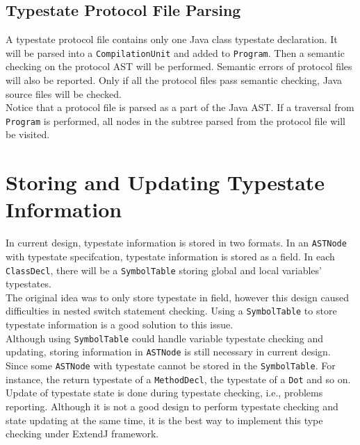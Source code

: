 \documentclass[]{article}
\begin{document}
\subsection{Typestate Protocol File Parsing}
A typestate protocol file contains only one Java class typestate declaration. It will be parsed into a \texttt{CompilationUnit} and added to \texttt{Program}. Then a semantic checking on the protocol AST will be performed. Semantic errors of protocol files will also be reported. Only if all the protocol files pass semantic checking, Java source files will be checked. \\[0.2cm]
Notice that a protocol file is parsed as a part of the Java AST. If a traversal from \texttt{Program} is performed, all nodes in the subtree parsed from the protocol file will be visited.

\section{Storing and Updating Typestate Information}
In current design, typestate information is stored in two formats. In an \texttt{ASTNode} with typestate specifcation, typestate information is stored as a field. In each \texttt{ClassDecl}, there will be a \texttt{SymbolTable} storing global and local variables' typestates.\\[0.2cm]
The original idea was to only store typestate in field, however this design caused difficulties in nested switch statement checking. Using a \texttt{SymbolTable} to store typestate information is a good solution to this issue.\\[0.2cm]
Although using \texttt{SymbolTable} could handle variable typestate checking and updating, storing information in \texttt{ASTNode} is still necessary in current design. Since some \texttt{ASTNode} with typestate cannot be stored in the \texttt{SymbolTable}. For instance, the return typestate of a \texttt{MethodDecl}, the typestate of a \texttt{Dot} and so on. \\[0.2cm]
Update of typestate state is done during typestate checking, i.e., problems reporting. Although it is not a good design to perform typestate checking and state updating at the same time, it is the best way to implement this type checking under ExtendJ framework.
\end{document}
